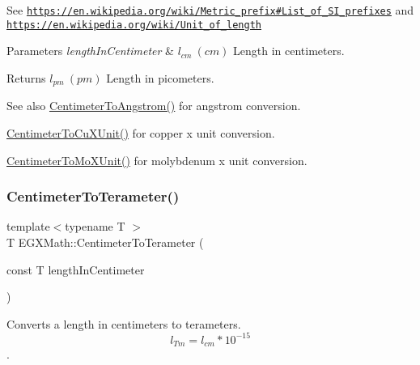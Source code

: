 See \href{https://en.wikipedia.org/wiki/Metric_prefix#List_of_SI_prefixes}{\tt https\+://en.\+wikipedia.\+org/wiki/\+Metric\+\_\+prefix\#\+List\+\_\+of\+\_\+\+S\+I\+\_\+prefixes} and \href{https://en.wikipedia.org/wiki/Unit_of_length}{\tt https\+://en.\+wikipedia.\+org/wiki/\+Unit\+\_\+of\+\_\+length} 
\begin{DoxyParams}{Parameters}
{\em length\+In\+Centimeter} & $ l_{cm}\ (cm)$ Length in centimeters. \\
\hline
\end{DoxyParams}
\begin{DoxyReturn}{Returns}
$ l_{pm}\ (pm)$ Length in picometers. 
\end{DoxyReturn}
\begin{DoxySeeAlso}{See also}
\mbox{\hyperlink{group___e_g_x_math-_conversions-_length_conversions-_s_i-_centimeter-_non-_s_i_gacabf2b01cd8676ffb5ec8c70ecd621b6}{Centimeter\+To\+Angstrom()}} for angstrom conversion. 

\mbox{\hyperlink{group___e_g_x_math-_conversions-_length_conversions-_s_i-_centimeter-_non-_s_i_ga98d44269c80a1c5ab7c38d27aba39517}{Centimeter\+To\+Cu\+X\+Unit()}} for copper x unit conversion. 

\mbox{\hyperlink{group___e_g_x_math-_conversions-_length_conversions-_s_i-_centimeter-_non-_s_i_ga4e94aa6f1cc6aaeb751384a8472b01fd}{Centimeter\+To\+Mo\+X\+Unit()}} for molybdenum x unit conversion. 
\end{DoxySeeAlso}
\mbox{\label{group___e_g_x_math-_conversions-_length_conversions-_s_i-_centimeter-_s_i_ga84d4f8159550a726d78bb55e6247e10c}} 
\subsubsection{\texorpdfstring{Centimeter\+To\+Terameter()}{CentimeterToTerameter()}}
{\footnotesize\ttfamily template$<$typename T $>$ \\
T E\+G\+X\+Math\+::\+Centimeter\+To\+Terameter (\begin{DoxyParamCaption}\item[{const T}]{length\+In\+Centimeter }\end{DoxyParamCaption})}



Converts a length in centimeters to terameters. \[ l_{Tm}=l_{cm} * 10^{-15} \]. 


